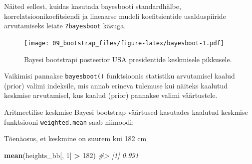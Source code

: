 \documentclass[]{book}
\newenvironment{Shaded}{\begin{snugshade}}{\end{snugshade}}
\newcommand{\KeywordTok}[1]{\textcolor[rgb]{0.13,0.29,0.53}{\textbf{#1}}}
\newcommand{\DataTypeTok}[1]{\textcolor[rgb]{0.13,0.29,0.53}{#1}}
\newcommand{\DecValTok}[1]{\textcolor[rgb]{0.00,0.00,0.81}{#1}}
\newcommand{\FloatTok}[1]{\textcolor[rgb]{0.00,0.00,0.81}{#1}}
\newcommand{\StringTok}[1]{\textcolor[rgb]{0.31,0.60,0.02}{#1}}
\newcommand{\CommentTok}[1]{\textcolor[rgb]{0.56,0.35,0.01}{\textit{#1}}}
\newcommand{\OtherTok}[1]{\textcolor[rgb]{0.56,0.35,0.01}{#1}}
\newcommand{\OperatorTok}[1]{\textcolor[rgb]{0.81,0.36,0.00}{\textbf{#1}}}
\newcommand{\NormalTok}[1]{#1}
\begin{document}
Näited sellest, kuidas kasutada bayesbooti standardhälbe,
korrelatsioonikoefitsiendi ja lineaarse mudeli koefitsientide
usalduspiiride arvutamiseks leiate \texttt{?bayesboot} käsuga.




\begin{Shaded}
\end{Shaded}

\begin{figure}
\centering
\texttt{[image: 09\_bootstrap\_files/figure-latex/bayesboot-1.pdf]}
\caption{\label{fig:bayesboot}Bayesi bootstrapi posteerior USA presidentide keskmisele
pikkusele.}
\end{figure}

\begin{Shaded}
\end{Shaded}

Vaikimisi pannakse \texttt{bayesboot()} funktsioonis statistiku
arvutamisel kaalud (prior) valimi indeksile, mis annab erineva tulemuse
kui näiteks kaalutud keskmise arvutamisel, kus kaalud (prior) pannakse
valimi väärtustele.

Aritmeetilise keskmise Bayesi bootstrap väärtused kasutades kaalutud
keskmise funktsiooni \texttt{weighted.mean} saab niimoodi:

\begin{Shaded}
\end{Shaded}

Tõenäosus, et keskmine on suurem kui 182 cm

\begin{Shaded}
\begin{Highlighting}[]
\KeywordTok{mean}\NormalTok{(heights_bb[, }\DecValTok{1}\NormalTok{] }\OperatorTok{>}\StringTok{ }\DecValTok{182}\NormalTok{)}
\CommentTok{#> [1] 0.991}
\end{Highlighting}
\end{Shaded}
\end{document}

